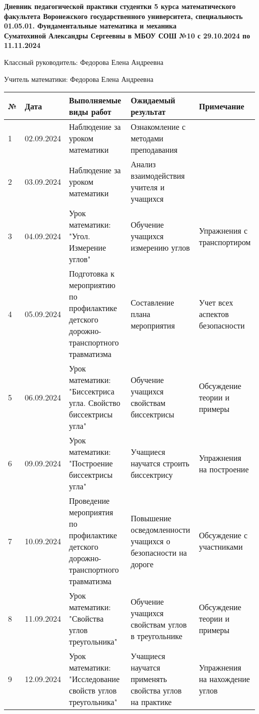 \documentclass{article}
\begin{document}
\begin{center}
    \textbf{Дневник педагогической практики студентки 5 курса математического факультета Воронежского государственного университета, специальность 01.05.01. Фундаментальные математика и механика }\\
    \textbf{Суматохиной Александры Сергеевны в МБОУ СОШ №10 с 29.10.2024 по 11.11.2024}\\
    \end{center}

Классный руководитель: Федорова Елена Андреевна

Учитель математики: Федорова Елена Андреевна\\


\begin{longtable}{|p{0.3cm}|p{1.5cm}|p{5.8cm}|p{5.5cm}|p{3.5cm}|}    \hline
    \textbf{№} & \textbf{Дата} & \textbf{Выполняемые виды работ} & \textbf{Ожидаемый результат} & \textbf{Примечание} \\ \hline
1 & 02.09.2024 & Наблюдение за уроком математики & Ознакомление с методами преподавания & \\ \hline
2 & 03.09.2024 & Наблюдение за уроком математики & Анализ взаимодействия учителя и учащихся & \\ \hline
3 & 04.09.2024 & Урок математики: "Угол. Измерение углов" & Обучение учащихся измерению углов & Упражнения с транспортиром \\ \hline
4 & 05.09.2024 & Подготовка к мероприятию по профилактике детского дорожно-транспортного травматизма & Составление плана мероприятия & Учет всех аспектов безопасности \\ \hline
5 & 06.09.2024 & Урок математики: "Биссектриса угла. Свойство биссектрисы угла" & Обучение учащихся свойствам биссектрисы & Обсуждение теории и примеры \\ \hline
6 & 09.09.2024 & Урок математики: "Построение биссектрисы угла" & Учащиеся научатся строить биссектрису & Упражнения на построение \\ \hline
7 & 10.09.2024 & Проведение мероприятия по профилактике детского дорожно-транспортного травматизма & Повышение осведомленности учащихся о безопасности на дороге & Обсуждение с участниками \\ \hline
8 & 11.09.2024 & Урок математики: "Свойства углов треугольника" & Обучение учащихся свойствам углов в треугольнике & Обсуждение теории и примеры \\ \hline
9 & 12.09.2024 & Урок математики: "Исследование свойств углов треугольника" & Учащиеся научатся применять свойства углов на практике & Упражнения на нахождение углов \\ \hline

\end{longtable}
\end{document}

